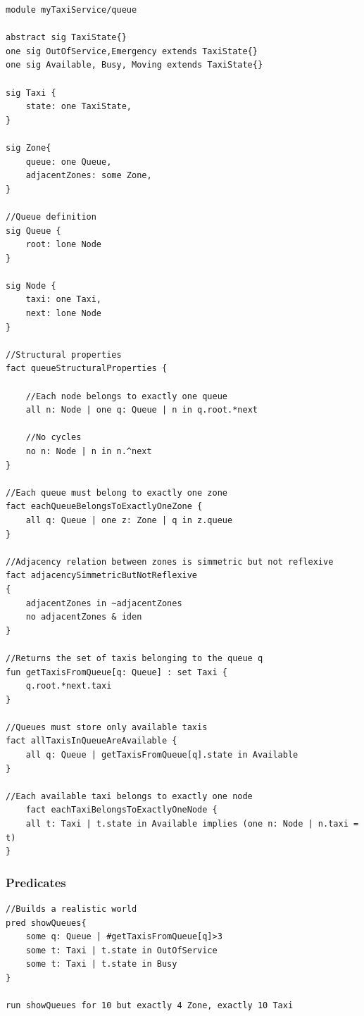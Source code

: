 \begin{lstlisting}[breaklines=true]
module myTaxiService/queue

abstract sig TaxiState{} 
one sig OutOfService,Emergency extends TaxiState{} 
one sig Available, Busy, Moving extends TaxiState{}

sig Taxi { 	
	state: one TaxiState, 
}

sig Zone{ 	
	queue: one Queue, 	
	adjacentZones: some Zone, 
}

//Queue definition
sig Queue { 	
	root: lone Node 
}

sig Node { 	
	taxi: one Taxi, 	
	next: lone Node 
}

//Structural properties 
fact queueStructuralProperties { 
	
	//Each node belongs to exactly one queue 	
	all n: Node | one q: Queue | n in q.root.*next	

	//No cycles
	no n: Node | n in n.^next									 
}

//Each queue must belong to exactly one zone 
fact eachQueueBelongsToExactlyOneZone { 	
	all q: Queue | one z: Zone | q in z.queue 
}

//Adjacency relation between zones is simmetric but not reflexive 
fact adjacencySimmetricButNotReflexive 
{ 	
	adjacentZones in ~adjacentZones 	
	no adjacentZones & iden 
}

//Returns the set of taxis belonging to the queue q 
fun getTaxisFromQueue[q: Queue] : set Taxi {
	q.root.*next.taxi 
}

//Queues must store only available taxis 
fact allTaxisInQueueAreAvailable { 	
	all q: Queue | getTaxisFromQueue[q].state in Available 
}

//Each available taxi belongs to exactly one node  
	fact eachTaxiBelongsToExactlyOneNode { 	
	all t: Taxi | t.state in Available implies (one n: Node | n.taxi = t) 
} 
\end{lstlisting}



\subsubsection{Predicates}

\begin{lstlisting}
//Builds a realistic world 	
pred showQueues{ 	
	some q: Queue | #getTaxisFromQueue[q]>3 	
	some t: Taxi | t.state in OutOfService 	
	some t: Taxi | t.state in Busy 
}

run showQueues for 10 but exactly 4 Zone, exactly 10 Taxi
\end{lstlisting}


